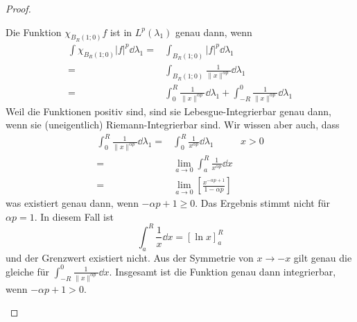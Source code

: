 \begin{proof}
	\begin{parts}
	\item \label{part:advanalblatt11-1a}Die Funktion $\chi_{B_R(1;0)}f$ ist in $L^p(\lambda_1)$ genau dann, wenn
	\begin{align*}
		\int \chi_{B_R(1;0)}|f|^p \dd{\lambda_1}=&\int_{B_R(1;0)} |f|^p \dd{\lambda_1}\\
		=&\int_{B_R(1;0)}\frac{1}{\|x\|^{\alpha p}}\dd{\lambda_1}\\
		=&\int_0^R \frac{1}{\|x\|^{\alpha p}}\dd{\lambda_1}+\int_{-R}^0 \frac{1}{\|x\|^{\alpha p}}\dd{\lambda_1}
	\end{align*}
	Weil die Funktionen positiv sind, sind sie Lebesgue-Integrierbar genau dann, wenn sie (uneigentlich) Riemann-Integrierbar sind. Wir wissen aber auch, dass
	\begin{align*}
		\int_0^R \frac{1}{\|x\|^{\alpha p}}\dd{\lambda_1}=&\int_0^R \frac{1}{x^{\alpha p}}\dd{\lambda_1} & x>0\\
		=&\lim_{a \to 0} \int_a^R \frac{1}{x^{\alpha p}}\dd{x}\\
		=&\lim_{a \to 0}\left[ \frac{x^{-\alpha p + 1}}{1-\alpha p} \right] 
	\end{align*}
	was existiert genau dann, wenn $-\alpha p + 1 \ge 0$. Das Ergebnis stimmt nicht f\"{u}r $\alpha p=1$. In diesem Fall ist
	\[
		\int_a^R \frac{1}{x}\dd{x}=[\ln x]_a^R
	\]
	und der Grenzwert existiert nicht. Aus der Symmetrie von $x\to -x$ gilt genau die gleiche f\"{u}r $\int_{-R}^0 \frac{1}{\|x\|^{\alpha p}}\dd{x}$. Insgesamt ist die Funktion genau dann integrierbar, wenn $-\alpha p + 1 >0$. 


\end{parts}
\end{proof}
